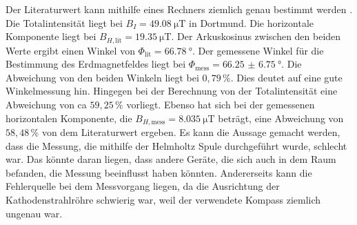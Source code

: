 Der Literaturwert kann mithilfe eines Rechners ziemlich genau bestimmt werden \cite{3}.
Die Totalintensität liegt bei $B_I =\SI{49,08}{\micro\tesla}$ in Dortmund.
Die horizontale Komponente liegt bei $B_{H, \text{lit}} = \SI{19.35}{\micro\tesla}$.
Der Arkuskosinus zwischen den beiden Werte ergibt einen Winkel von $\Phi_{\text{lit}} = \SI{66.78}{\degree}$.
Der gemessene Winkel für die Bestimmung des Erdmagnetfeldes liegt bei $\Phi_{\text{mess}} = \SI{66.25(675)}{\degree}$.
Die Abweichung von den beiden Winkeln liegt bei $0,79 \, \%$. Dies deutet auf eine gute Winkelmessung hin.
Hingegen bei der Berechnung von der Totalintensität eine Abweichung von ca $59,25 \,\%$ vorliegt.
Ebenso hat sich bei der gemessenen horizontalen Komponente, die $B_{H, \text{mess}} =\SI{8.035}{\micro\tesla}$ beträgt,
eine Abweichung von $58,48 \,\%$ von dem Literaturwert ergeben.
Es kann die Aussage gemacht werden, dass die Messung, die mithilfe der Helmholtz Spule
durchgeführt wurde, schlecht war. Das könnte daran liegen, dass andere Geräte,
die sich auch in dem Raum befanden, die Messung beeinflusst haben könnten. Andererseits
kann die Fehlerquelle bei dem Messvorgang liegen, da die Ausrichtung der Kathodenstrahlröhre
schwierig war, weil der verwendete Kompass ziemlich ungenau war.
